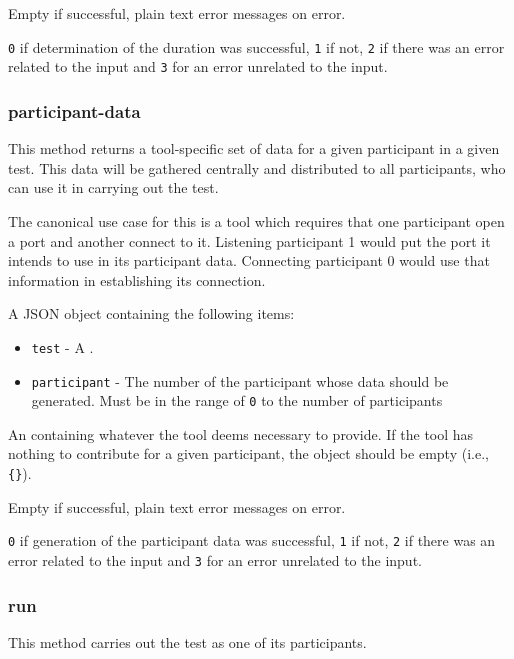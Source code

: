 \documentclass[10pt,titlepage]{article}
\begin{document}
 Empty if successful, plain text error
messages on error.

 {\tt 0} if determination of the duration was
successful, {\tt 1} if not, {\tt 2} if there was an error related to
the input and {\tt 3} for an error unrelated to the input.



\subsubsection{participant-data}

This method returns a tool-specific set of data for a given
participant in a given test.  This data will be gathered centrally and
distributed to all participants, who can use it in carrying out the test.

The canonical use case for this is a tool which requires that one
participant open a port and another connect to it.  Listening
participant 1 would put the port it intends to use in its participant
data.  Connecting participant 0 would use that information in
establishing its connection.


 A JSON object containing the following items:

\begin{itemize}
\item{\tt test} - A .

\item{\tt participant} - The number of the participant whose data
  should be generated.  Must be in the range of {\tt 0} to the number
  of participants
\end{itemize}


 An  containing
whatever the tool deems necessary to provide.  If the tool has nothing
to contribute for a given participant, the object should be empty
(i.e., {\tt \{\}}).

 Empty if successful, plain text error
messages on error.

 {\tt 0} if generation of the participant
data was successful, {\tt 1} if not, {\tt 2} if there was an error
related to the input and {\tt 3} for an error unrelated to the input.



\subsubsection{run}\label{toolrun}
This method carries out the test as one of its participants.
\end{document}
